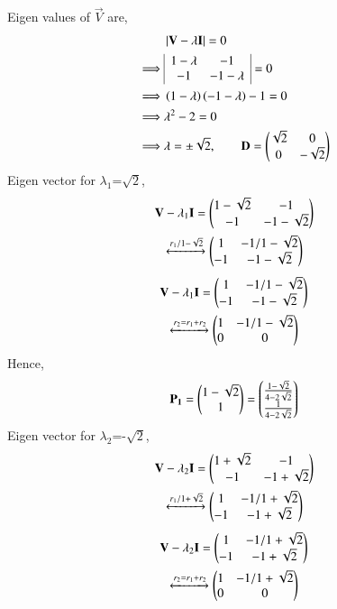 \documentclass[journal,12pt,twocolumn]{IEEEtran}
\begin{document}
Eigen values of $\vec{V}$ are,
\begin{align}
	& \left\vert\mathbf{V}-\lambda\mathbf{I}\right\vert = 0 \\
\implies	& \begin{array}{|cc|}
		1-\lambda & -1\\ -1 & -1-\lambda
	\end{array}=0 \\
\implies & \left(1-\lambda\right)\left(-1-\lambda\right) -1 =0\\
\implies &\lambda^2 -2 =0 \\
\implies & \lambda = \pm \sqrt{2}, \qquad \mathbf{D} = \begin{pmatrix}\sqrt{2} &0 \\ 0 & -\sqrt{2}\end{pmatrix} 
\end{align}
Eigen vector for $\lambda_1$=$\sqrt{2}$,
\begin{multline}
	\mathbf{V}-\lambda_1\mathbf{I} = \begin{pmatrix}1-\sqrt{2} & -1 \\ -1 & -1-\sqrt{2}\end{pmatrix}\\
	 \xleftrightarrow[]{r_1/1-\sqrt{2}} \begin{pmatrix}1 & -1/1-\sqrt{2} \\ -1 & -1-\sqrt{2}\end{pmatrix}
\end{multline}
\begin{multline}
	\mathbf{V}-\lambda_1\mathbf{I} = \begin{pmatrix}1 & -1/1-\sqrt{2} \\ -1 & -1-\sqrt{2}\end{pmatrix} \\
	\xleftrightarrow[]{r_2 = r_1 + r_2} \begin{pmatrix}1 & -1/1-\sqrt{2} \\ 0 & 0\end{pmatrix}
\end{multline}
Hence,
\begin{align}
\mathbf{P_1}= \begin{pmatrix}1-\sqrt{2} \\ 1\end{pmatrix} = \begin{pmatrix}\frac{1-\sqrt{2}}{4-2\sqrt{2}} \\ \frac{1}{4-2\sqrt{2}}\end{pmatrix}
\end{align}
Eigen vector for $\lambda_2$=-$\sqrt{2}$,
\begin{multline}
	\mathbf{V}-\lambda_2\mathbf{I} = \begin{pmatrix}1+\sqrt{2} & -1 \\ -1 & -1+\sqrt{2}\end{pmatrix}\\
	\xleftrightarrow[]{r_1/1+\sqrt{2}} \begin{pmatrix}1 & -1/1+\sqrt{2} \\ -1 & -1+\sqrt{2}\end{pmatrix}
\end{multline}
\begin{multline}
	\mathbf{V}-\lambda_2\mathbf{I} = \begin{pmatrix}1 & -1/1+\sqrt{2} \\ -1 & -1+\sqrt{2}\end{pmatrix} \\
	\xleftrightarrow[]{r_2 = r_1 + r_2} \begin{pmatrix}1 & -1/1+\sqrt{2} \\ 0 & 0\end{pmatrix}
\end{multline}
\end{document}
